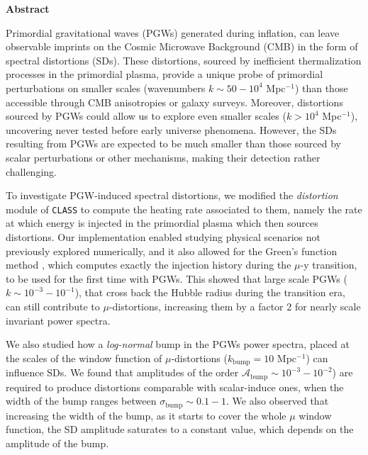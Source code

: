 \vspace*{10pt}
\begin{center}
	\large\textbf{Abstract}\normalsize
\end{center}
\vspace*{10pt}
\begin{adjustwidth}{1cm}{1cm}
Primordial gravitational waves (PGWs) generated during inflation, can leave observable imprints on
the Cosmic Microwave Background (CMB) in the form of spectral distortions (SDs). These distortions,
sourced by inefficient thermalization processes in the primordial plasma, provide a unique probe of
primordial perturbations on smaller scales (wavenumbers $k \sim 50 - 10^{4}$ Mpc$^{-1}$) than those accessible
through CMB anisotropies or galaxy surveys. Moreover, distortions sourced by PGWs could allow us to
explore even smaller scales ($k > 10^{4}$ Mpc$^{-1}$), uncovering never tested before early universe phenomena. However, the SDs resulting from PGWs are expected to be much smaller than those sourced by scalar perturbations or other mechanisms, making their detection rather challenging.

To investigate PGW-induced spectral distortions, we modified the \emph{distortion} module of \texttt{\texttt{CLASS}} to compute the heating rate associated to them, namely the rate at which energy is injected in the primordial plasma which then sources distortions. Our implementation enabled studying physical
scenarios not previously explored numerically, and it also allowed for the Green’s function method \cite{Chluba_Green}, which computes exactly the injection history during the $\mu$-y transition, to be used for the first time with PGWs. This showed that large scale PGWs ($k\sim 10^{-3}-10^{-1}$), that cross back the Hubble radius during the transition era, can still contribute to $\mu$-distortions, increasing them by a factor 2 for nearly scale invariant power spectra.

We also studied how a \emph{log-normal} bump in the PGWs power spectra, placed at the scales of the window function of $\mu$-distortions ($k_\text{bump}=10$ Mpc$^{-1}$) can influence SDs. We found that amplitudes of the order $\mathcal{A}_\text{bump}\sim 10^{-3}-10^{-2}$) are required to produce distortions comparable with scalar-induce ones, when the width of the bump ranges between $\sigma_\text{bump}\sim 0.1-1$. We also observed that increasing the width of the bump, as it starts to cover the whole $\mu$ window function, the SD amplitude saturates to a constant value, which depends on the amplitude of the bump. 


\end{adjustwidth}
